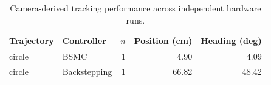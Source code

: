 \begin{table}[!t]
\centering
\caption{Camera-derived tracking performance across independent hardware runs.}
\label{tab:tracking}
\begin{tabular}{llrrr}
\hline
Trajectory & Controller & $n$ & Position (cm) & Heading (deg) \\
\hline
circle & BSMC & 1 & 4.90 & 4.09 \\
circle & Backstepping & 1 & 66.82 & 48.42 \\
\hline
\end{tabular}
\end{table}
